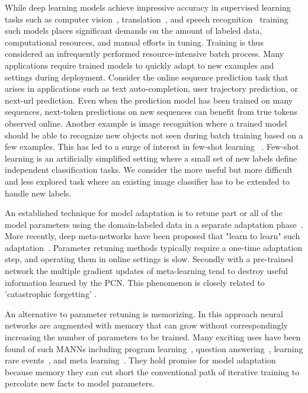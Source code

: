 \documentclass[letterpaper]{article} %
\begin{document}
While deep learning models achieve impressive accuracy in supervised learning tasks such as computer vision~\cite{Krizhevsky_imagenetclassification},  translation~\cite{WuGNMT16}, and speech recognition~\cite{Yu14ASR} training such models places significant demands on the  amount of labeled data, computational resources, and manual efforts in tuning.  Training is thus considered an infrequently performed resource-intensive batch process.
Many applications require trained models to quickly adapt to new examples and settings during deployment. Consider the online sequence prediction task that arises in applications such as text auto-completion, user trajectory prediction, or next-url prediction.  Even when the prediction model has been trained on many sequences, next-token predictions on new sequences can benefit from true tokens observed online.
Another example is image recognition where a trained model should be able to recognize new objects not seen during batch training based on a few examples. This has led to a surge of interest in  few-shot learning ~\cite{kaiser2017,SantoroBBWL16,VinyalsBLKW16,zemel17}. Few-shot learning is an artificially simplified setting where a small set of new labels define independent classification tasks. We consider the more useful but more difficult and less explored task where an existing image classifier has to be extended to handle new labels.






An established technique for model adaptation is to retune part or all of the model parameters using the domain-labeled data in a separate adaptation phase~\cite{daume2007}.  More recently, deep meta-networks have been proposed that "learn to learn" such adaptation~\cite{Rei15,Finn2017ModelAgnosticMF,Huang2015MaximumAP,ravi17}. Parameter retuning methods typically require a one-time adaptation step, and operating them in online settings is slow.
Secondly with a pre-trained network the multiple gradient updates of meta-learning tend to destroy useful information learned by the PCN. This phenomenon is closely related to 'catastrophic forgetting'  \cite{French99,KirkpatrickPRVD16}.

An alternative to parameter retuning is memorizing.  In this approach neural networks are augmented  with memory that can grow without correspondingly increasing the number of parameters to be trained.  Many exciting uses have been found of such MANNs including program learning~\cite{GravesNTM}, question answering~\cite{Weston16,GulcehreCCB16}, learning rare events~\cite{kaiser2017}, and meta learning~\cite{SantoroBBWL16}.  They hold promise for model adaptation because memory they can cut short the conventional path of iterative training to percolate new facts to model parameters.
\end{document}

